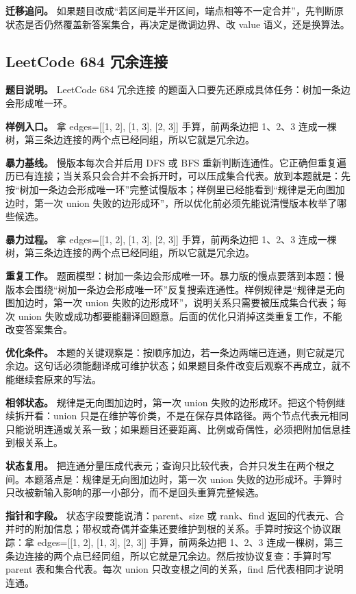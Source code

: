 \textbf{迁移追问。} 如果题目改成“若区间是半开区间，端点相等不一定合并”，先判断原状态是否仍然覆盖新答案集合，再决定是微调边界、改 value 语义，还是换算法。

\subsection{LeetCode 684 冗余连接}

\textbf{题目说明。} LeetCode 684 冗余连接 的题面入口要先还原成具体任务：树加一条边会形成唯一环。

\textbf{样例入口。} 拿 edges=[[1, 2], [1, 3], [2, 3]] 手算，前两条边把 1、2、3 连成一棵树，第三条边连接的两个点已经同组，所以它就是冗余边。

\textbf{暴力基线。} 慢版本每次合并后用 DFS 或 BFS 重新判断连通性。它正确但重复遍历已有连接；当关系只会合并不会拆开时，可以压成集合代表。放到本题就是：先按“树加一条边会形成唯一环”完整试慢版本；样例里已经能看到“规律是无向图加边时，第一次 union 失败的边形成环”，所以优化前必须先能说清慢版本枚举了哪些候选。

\textbf{暴力过程。} 拿 edges=[[1, 2], [1, 3], [2, 3]] 手算，前两条边把 1、2、3 连成一棵树，第三条边连接的两个点已经同组，所以它就是冗余边。

\textbf{重复工作。} 题面模型：树加一条边会形成唯一环。暴力版的慢点要落到本题：慢版本会围绕“树加一条边会形成唯一环”反复搜索连通性。样例规律是“规律是无向图加边时，第一次 union 失败的边形成环”，说明关系只需要被压成集合代表；每次 union 失败或成功都要能翻译回题意。后面的优化只消掉这类重复工作，不能改变答案集合。

\textbf{优化条件。} 本题的关键观察是：按顺序加边，若一条边两端已连通，则它就是冗余边。这句话必须能翻译成可维护状态；如果题目条件改变后观察不再成立，就不能继续套原来的写法。

\textbf{相邻状态。} 规律是无向图加边时，第一次 union 失败的边形成环。把这个特例继续拆开看：union 只是在维护等价类，不是在保存具体路径。两个节点代表元相同只能说明连通或关系一致；如果题目还要距离、比例或奇偶性，必须把附加信息挂到根关系上。

\textbf{状态复用。} 把连通分量压成代表元；查询只比较代表，合并只发生在两个根之间。本题落点是：规律是无向图加边时，第一次 union 失败的边形成环。手算时只改被新输入影响的那一小部分，而不是回头重算完整候选。

\textbf{指针和字段。} 状态字段要能说清：parent、size 或 rank、find 返回的代表元、合并时的附加信息；带权或奇偶并查集还要维护到根的关系。手算时按这个协议跟踪：拿 edges=[[1, 2], [1, 3], [2, 3]] 手算，前两条边把 1、2、3 连成一棵树，第三条边连接的两个点已经同组，所以它就是冗余边。然后按协议复查：手算时写 parent 表和集合代表。每次 union 只改变根之间的关系，find 后代表相同才说明连通。

